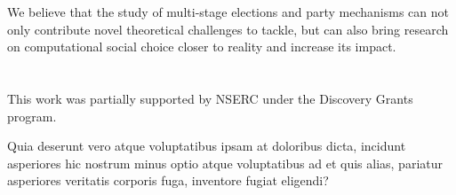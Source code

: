 \documentclass[letterpaper]{article} %
\theoremstyle{definition}
\begin{document}
We believe that the study of multi-stage elections and party mechanisms can not only contribute novel theoretical challenges to tackle, but can also bring research on computational social choice closer to reality and increase its impact.

\section{}
This work was partially supported by NSERC under the Discovery Grants program.

Quia deserunt vero atque voluptatibus ipsam at doloribus dicta, incidunt asperiores hic nostrum minus optio atque voluptatibus ad et quis alias, pariatur asperiores veritatis corporis fuga, inventore fugiat eligendi?\clearpage

\end{document}
